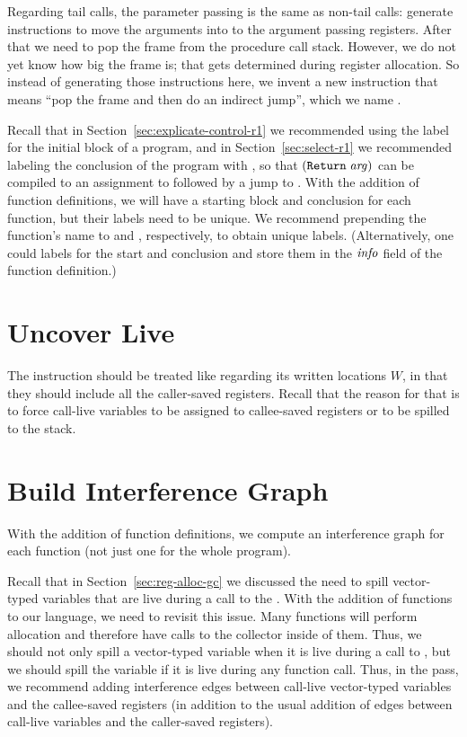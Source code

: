 \documentclass[11pt]{book}
\begin{document}
Regarding tail calls, the parameter passing is the same as non-tail
calls: generate instructions to move the arguments into to the
argument passing registers.  After that we need to pop the frame from
the procedure call stack.  However, we do not yet know how big the
frame is; that gets determined during register allocation. So instead
of generating those instructions here, we invent a new instruction
that means ``pop the frame and then do an indirect jump'', which we
name .

Recall that in Section~\ref{sec:explicate-control-r1} we recommended
using the label  for the initial block of a program, and
in Section~\ref{sec:select-r1} we recommended labeling the conclusion
of the program with , so that $(\texttt{Return}\;\mathit{arg})$
can be compiled to an assignment to  followed by a jump to
. With the addition of function definitions, we will
have a starting block and conclusion for each function, but their
labels need to be unique. We recommend prepending the function's name
to  and , respectively, to obtain unique
labels. (Alternatively, one could  labels for the start
and conclusion and store them in the $\mathit{info}$ field of the
function definition.)


\section{Uncover Live}


The  instruction should be treated like
 regarding its written locations $W$, in that they should
include all the caller-saved registers. Recall that the reason for
that is to force call-live variables to be assigned to callee-saved
registers or to be spilled to the stack.

\section{Build Interference Graph}

With the addition of function definitions, we compute an interference
graph for each function (not just one for the whole program).

Recall that in Section~\ref{sec:reg-alloc-gc} we discussed the need to
spill vector-typed variables that are live during a call to the
.  With the addition of functions to our language, we
need to revisit this issue. Many functions will perform allocation and
therefore have calls to the collector inside of them. Thus, we should
not only spill a vector-typed variable when it is live during a call
to , but we should spill the variable if it is live
during any function call. Thus, in the  pass,
we recommend adding interference edges between call-live vector-typed
variables and the callee-saved registers (in addition to the usual
addition of edges between call-live variables and the caller-saved
registers).
\end{document}
